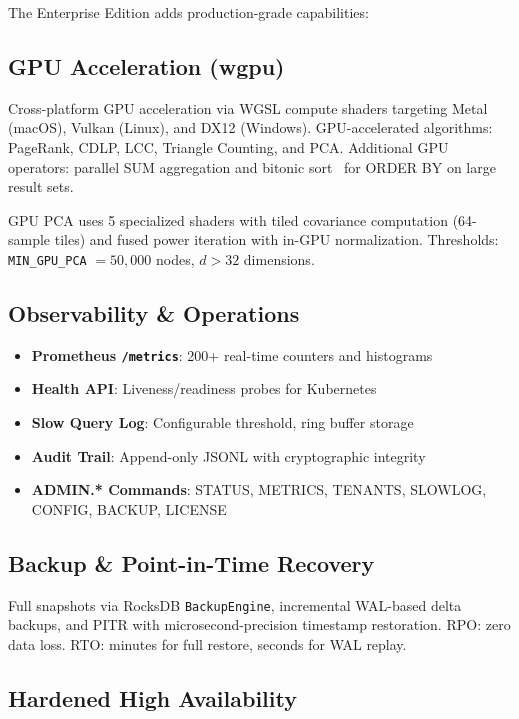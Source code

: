 \documentclass[11pt]{article}
\begin{document}
The Enterprise Edition adds production-grade capabilities:

\subsection{GPU Acceleration (wgpu)}

Cross-platform GPU acceleration via WGSL compute shaders targeting Metal (macOS), Vulkan (Linux), and DX12 (Windows). GPU-accelerated algorithms: PageRank, CDLP, LCC, Triangle Counting, and PCA. Additional GPU operators: parallel SUM aggregation and bitonic sort~\citep{batcher1968sorting} for ORDER BY on large result sets.

GPU PCA uses 5 specialized shaders with tiled covariance computation (64-sample tiles) and fused power iteration with in-GPU normalization. Thresholds: \texttt{MIN\_GPU\_PCA} $= 50{,}000$ nodes, $d > 32$ dimensions.

\subsection{Observability \& Operations}

\begin{itemize}[leftmargin=*]
  \item \textbf{Prometheus \texttt{/metrics}}: 200+ real-time counters and histograms
  \item \textbf{Health API}: Liveness/readiness probes for Kubernetes
  \item \textbf{Slow Query Log}: Configurable threshold, ring buffer storage
  \item \textbf{Audit Trail}: Append-only JSONL with cryptographic integrity
  \item \textbf{ADMIN.* Commands}: STATUS, METRICS, TENANTS, SLOWLOG, CONFIG, BACKUP, LICENSE
\end{itemize}

\subsection{Backup \& Point-in-Time Recovery}

Full snapshots via RocksDB \texttt{BackupEngine}, incremental WAL-based delta backups, and PITR with microsecond-precision timestamp restoration. RPO: zero data loss. RTO: minutes for full restore, seconds for WAL replay.

\subsection{Hardened High Availability}
\end{document}
